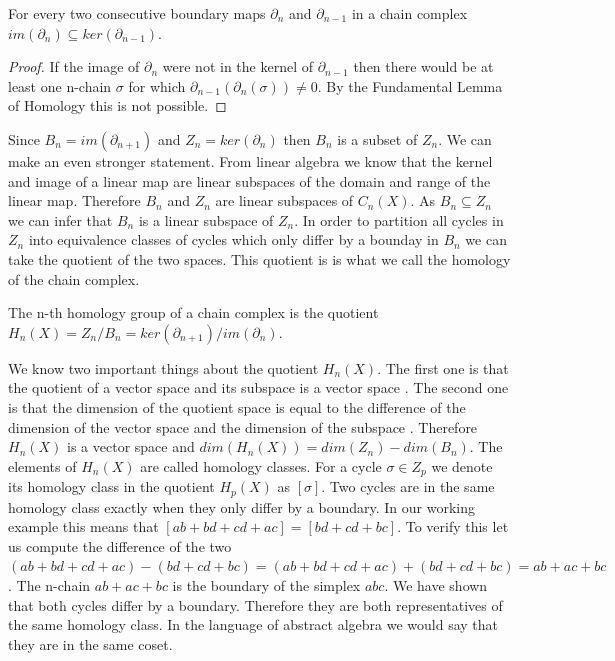 \begin{cor}  For every two consecutive boundary maps $\partial_n$ and $\partial_{n-1}$ in a chain complex $im(\partial_n) \subseteq ker(\partial_{n-1})$. \end{cor}

\begin{proof}
    If the image of $\partial_n$ were not in the kernel of $\partial_{n-1}$ then there would be at least one n-chain $\sigma$ for which $\partial_{n-1}(\partial_n(\sigma)) \ne 0$. By the Fundamental Lemma of Homology this is not possible.
\end{proof}



Since $B_n = im(\partial_{n+1})$ and $Z_n = ker(\partial_n)$ then $B_n$ is a subset of $Z_n$. We can make an even stronger statement. From linear algebra \cite{lin-alg-done-right} we know that the kernel and image of a linear map are linear subspaces of the domain and range of the linear map. Therefore $B_n$ and $Z_n$ are linear subspaces of $C_n(X)$. As $B_n \subseteq Z_n$ we can infer that $B_n$ is a linear subspace of $Z_n$. In order to partition all cycles in $Z_n$ into equivalence classes of cycles which only differ by a bounday in $B_n$ we can take the quotient of the two spaces. This quotient is is what we call the homology of the chain complex.

\begin{defn} The n-th homology group of a chain complex is the quotient $H_n(X) = Z_n \big/ B_n = ker(\partial_{n+1})\big/im(\partial_n)$. \end{defn}

We know two important things about the quotient $H_n(X)$. The first one is that the quotient of a vector space and its subspace is a vector space \cite{lin-alg-done-right}. The second one is that the dimension of the quotient space is equal to the difference of the dimension of the vector space and the dimension of the subspace \cite{lin-alg-done-right}. Therefore $H_n(X)$ is a vector space and $dim(H_n(X)) = dim(Z_n) - dim(B_n)$. The elements of $H_n(X)$ are called homology classes. For a cycle $\sigma \in Z_p$ we denote its homology class in the quotient $H_p(X)$ as $[\sigma]$. Two cycles are in the same homology class exactly when they only differ by a boundary. In our working example this means that $[ab + bd + cd + ac] = [bd + cd + bc]$. To verify this let us compute the difference of the two $(ab + bd + cd + ac) - (bd + cd + bc) = (ab + bd + cd + ac) + (bd + cd + bc) = ab + ac + bc$. The n-chain $ab + ac + bc$ is the boundary of the simplex
$abc$. We have shown that both cycles differ by a boundary. Therefore they are both representatives of the same homology class. In the language of abstract algebra we would say that they are in the same coset.

